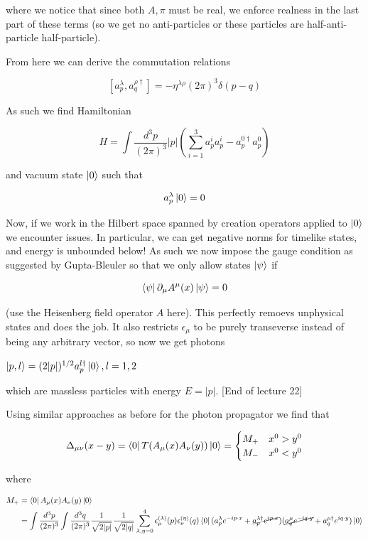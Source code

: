 \documentclass{article}
\theoremstyle{definition}
\begin{document}
where we notice that since both $A, \pi$ must be real, we enforce realness in
the last part of these terms (so we get no anti-particles or these particles are
half-anti-particle half-particle).

From here we can derive the commutation relations

$$ [a_p^\lambda, a^{\rho \dagger}_q ] = -\eta^{\lambda \rho} (2\pi)^3 \delta(p
- q) $$

As such we find Hamiltonian

$$ H = \int \frac{d^3p}{(2\pi)^3} |p| \left( \sum_{i = 1}^3 a_p^i a_p^i - a_p^{0
  \dagger} a_p^0 \right) $$

and vacuum state $\ket{0}$ such that

$$ a^\lambda_p \ket{0} = 0 $$

Now, if we work in the Hilbert space spanned by creation operators applied to
$\ket{0}$ we encounter issues. In particular, we can get negative norms for
timelike states, and energy is unbounded below! As such we now impose the
gauge condition as suggested by Gupta-Bleuler so that we only allow states
$\ket{\psi}$ if

$$ \bra{\psi} \partial_\mu A^\mu (x) \ket{\psi} = 0 $$

(use the Heisenberg field operator $A$ here). This perfectly remoevs unphysical
states and does the job. It also restricts $\epsilon_\mu$ to be purely
transeverse instead of being any arbitrary vector, so now we get photons

$\ket{p, l} = (2|p|)^{1/2} a^{l \dagger}_p \ket{0}, l=1,2$

which are massless particles with energy $E = |p|$. [End of lecture 22]

Using similar approaches as before for the photon propagator we find that

$$ \Delta_{\mu \nu} (x - y) = \bra{0} T(A_\mu(x) A_\nu(y)) \ket{0} =
\begin{cases}
  M_+ & x^0 > y^0 \\
  M_- & x^0 < y^0
\end{cases} $$

where

\begin{align*}
  M_+ &= \bra{0} A_\mu(x) A_\nu(y) \ket{0} \\
      &= \int \frac{d^3p}{(2\pi)^3} \int \frac{d^3q}{(2\pi)^3} \frac{1}{\sqrt{2 |p|}} \frac{1}{\sqrt{2 |q|}}
        \sum_{\lambda, \eta=0}^4 \epsilon_\mu^{(\lambda)}(p) \epsilon_\nu^{(\eta)}(q)
        \bra{0} (a_p^\lambda e^{-ip \cdot x} + \cancel{a^{\lambda \dagger}_p e^{ip \cdot x}})
        (\cancel{a^\mu_q e^{-iq \cdot y}} + a_q^{\mu \dagger} e^{iq \cdot y}) \ket{0} \\
\end{align*}
\end{document}

